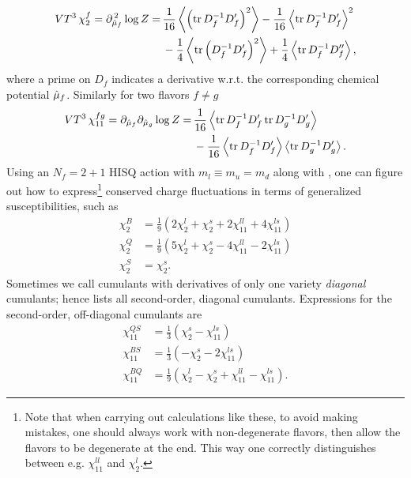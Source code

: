 \begin{equation}\begin{aligned}
  VT^3\,\chi_2^f =\partial_{\muh_f}^{\,2}\log Z
                 =\, & \frac{1}{16}\ev{\left(\tr D_f^{-1}D_f'\right)^2}
                    -\frac{1}{16}\ev{\tr D_f^{-1}D_f'}^2\\
                   & -\frac{1}{4}\ev{\tr \left(D_f^{-1} D_f'\right)^2}
                    +\frac{1}{4}\ev{\tr D_f^{-1}D_f''},
\end{aligned}\end{equation}
where a prime on $D_f$ indicates a derivative w.r.t. the corresponding chemical
potential $\hat{\mu}_f$. Similarly for two flavors $f\neq g$ 
\begin{equation}\begin{aligned}
  VT^3\,\chi_{11}^{fg} =\partial_{\muh_f}\partial_{\muh_g}\log Z
                 = \,& \frac{1}{16}\ev{\tr D_f^{-1}D_f'\tr D_g^{-1}D_g'} \\
                   & -\frac{1}{16}\ev{\tr D_f^{-1}D_f'}\ev{\tr D_g^{-1}D_g'}.
\end{aligned}\end{equation}
Using an $N_f=2+1$ HISQ action with $m_l\equiv m_u=m_d$ along with 
, one can figure out how to 
express\footnote{Note that when carrying out calculations like these, to avoid making mistakes,
one should always work with non-degenerate flavors, then allow the flavors to be
degenerate at the end. This way one correctly distinguishes between e.g.
$\chi_{11}^{ll}$ and $\chi_2^l$.} conserved charge fluctuations in terms of 
generalized susceptibilities, such as
\begin{equation}\begin{aligned}\label{eq:2ndorderdiagonal}
  \chi_2^B&=\frac{1}{9}\left(2\chi_2^l+\chi_2^s+2\chi_{11}^{ll}+4\chi_{11}^{ls}\right)\\
  \chi_2^Q&=\frac{1}{9}\left(5\chi_2^l+\chi_2^s-4\chi_{11}^{ll}-2\chi_{11}^{ls}\right)\\
  \chi_2^S&=\chi_2^s.
\end{aligned}\end{equation}
Sometimes we call cumulants with derivatives of only one variety
{\it diagonal} cumulants; hence
 lists all second-order, diagonal cumulants.
Expressions for the second-order, off-diagonal cumulants are
\begin{equation}\begin{aligned}
\chi^{QS}_{11}&=\frac{1}{3}\left(\chi^{s}_{2}-\chi^{ls}_{11}\right)\\
\chi^{BS}_{11}&=\frac{1}{3}\left(-\chi^{s}_{2}-2\chi^{ls}_{11}\right)\\
\chi^{BQ}_{11}&=\frac{1}{9}\left(\chi^{l}_{2}-\chi^{s}_{2}+\chi^{ll}_{11}-\chi^{ls}_{11}\right).
\end{aligned}\end{equation}


